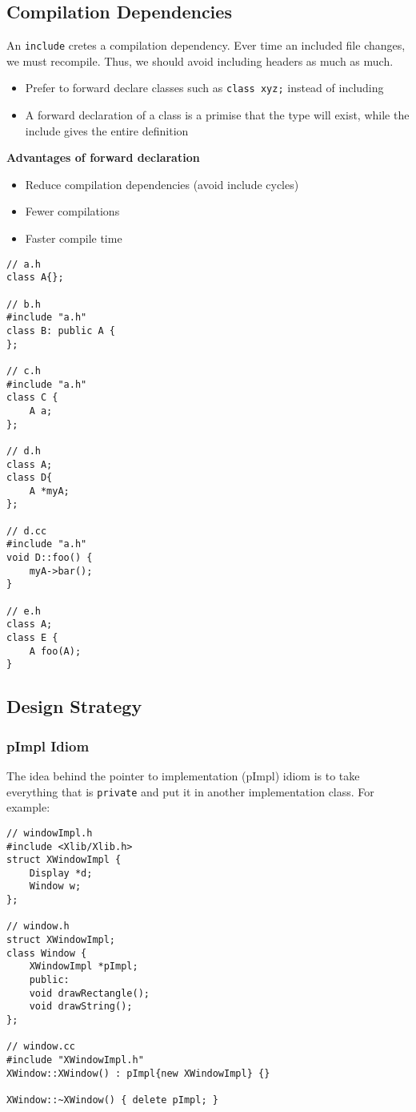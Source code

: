 \documentclass[12pt]{article}
\begin{document}
\subsection{Compilation Dependencies}
An \lstinline{include} cretes a compilation dependency. Ever time an included file changes, we must recompile. Thus, we should avoid including headers as much as much.
\begin{itemize}
    \item Prefer to forward declare classes such as \lstinline{class xyz;} instead of including
    \item A forward declaration of a class is a primise that the type will exist, while the include gives the entire definition
\end{itemize}
\textbf{Advantages of forward declaration}
\begin{itemize}
    \item Reduce compilation dependencies (avoid include cycles)
    \item Fewer compilations
    \item Faster compile time
\end{itemize}
\begin{lstlisting}
// a.h
class A{};

// b.h
#include "a.h"
class B: public A {
};

// c.h 
#include "a.h"
class C {
    A a;
};

// d.h
class A;
class D{
    A *myA;
};

// d.cc
#include "a.h"
void D::foo() {
    myA->bar();
}

// e.h
class A;
class E {
    A foo(A);
}
\end{lstlisting}

\subsection{Design Strategy}

\subsubsection{pImpl Idiom}
The idea behind the pointer to implementation (pImpl) idiom is to take everything that is \lstinline{private} and put it in another implementation class. For example:

\begin{lstlisting}
// windowImpl.h
#include <Xlib/Xlib.h>
struct XWindowImpl {
    Display *d;
    Window w;
};

// window.h
struct XWindowImpl;
class Window {
    XWindowImpl *pImpl;
    public:
    void drawRectangle();
    void drawString();
};

// window.cc
#include "XWindowImpl.h"
XWindow::XWindow() : pImpl{new XWindowImpl} {}

XWindow::~XWindow() { delete pImpl; }
\end{lstlisting}
\end{document}
